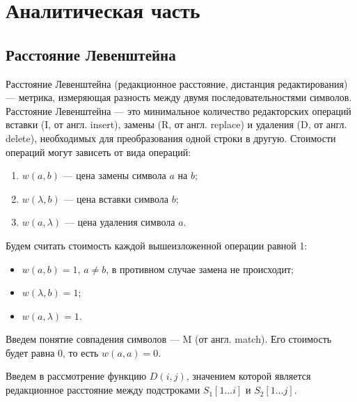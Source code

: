 \chapter{Аналитическая часть}
\section{Расстояние Левенштейна}

Расстояние Левенштейна \cite{levenshtein} (редакционное расстояние, дистанция редактирования) --- метрика, измеряющая разность между двумя последовательностями символов. Расстояние Левенштейна --- это минимальное количество редакторских операций вставки (I, от англ. insert), замены (R, от англ. replace) и удаления (D, от англ. delete), необходимых для преобразования одной строки в другую. Стоимости операций могут зависеть от вида операций:
\begin{enumerate}[label=\arabic*)]
	\item $w(a, b)$ --- цена замены символа $a$ на $b$;
	\item $w(\lambda, b)$ --- цена вставки символа $b$;
	\item $w(a, \lambda)$ --- цена удаления символа $a$.
\end{enumerate}

Будем считать стоимость каждой вышеизложенной операции равной 1:
\begin{itemize}[label=---]
	\item $w(a, b) = 1$, $a \neq b$, в противном случае замена не происходит;
	\item $w(\lambda, b) = 1$;
	\item $w(a, \lambda) = 1$.
\end{itemize}

Введем понятие совпадения символов --- M (от англ. match). Его стоимость будет равна 0, то есть $w(a, a) = 0$.

Введем в рассмотрение функцию $D(i, j)$, значением которой является
редакционное расстояние между подстроками $S_1[1...i]$ и $S_2[1...j]$.

